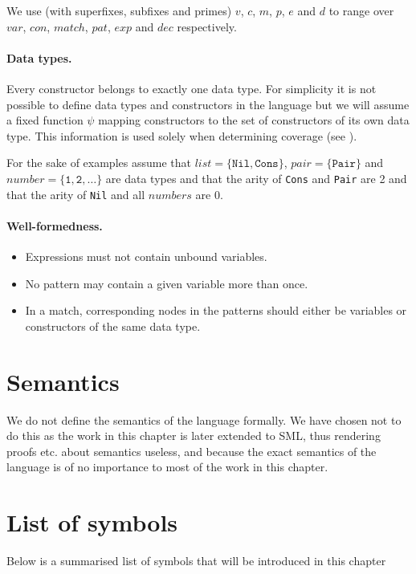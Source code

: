 We use (with superfixes, subfixes and primes) $v$, $c$, $m$, $p$, $e$ and $d$ to
range over $var$, $con$, $match$, $pat$, $exp$ and $dec$ respectively.

\paragraph{Data types.} Every constructor belongs to exactly one data type. For
simplicity it is not possible to define data types and constructors in the
language but we will assume a fixed function $\psi$ mapping constructors to the
set of constructors of its own data type. This information is used solely when
determining coverage (see ).

For the sake of examples assume that $list = \{\texttt{Nil}, \texttt{Cons}\}$,
$pair = \{\texttt{Pair}\}$ and $number = \{\texttt{1}, \texttt{2}, \ldots\}$ are
data types and that the arity of \texttt{Cons} and \texttt{Pair} are 2 and that
the arity of \texttt{Nil} and all $numbers$ are 0.

\paragraph{Well-formedness.}
\begin{itemize}
\item Expressions must not contain unbound variables.
\item No pattern may contain a given variable more than once.
\item In a match, corresponding nodes in the patterns should either be variables
  or constructors of the same data type.
\end{itemize}

\section{Semantics}
We do not define the semantics of the language formally. We have chosen not to
do this as the work in this chapter is later extended to SML, thus rendering
proofs etc. about semantics useless, and because the exact semantics of the
language is of no importance to most of the work in this chapter.

\section{List of symbols}

Below is a summarised list of symbols that will be introduced in this chapter
\\

